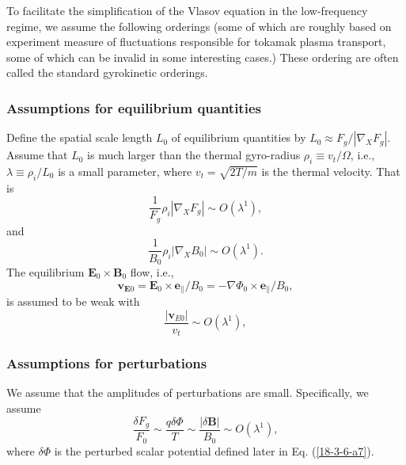 \documentclass{llncs}
\begin{document}
To facilitate the simplification of the Vlasov equation in the low-frequency
regime, we assume the following orderings (some of which are roughly based on
experiment measure of fluctuations responsible for tokamak plasma transport,
some of which can be invalid in some interesting cases.) These ordering are
often called the standard gyrokinetic orderings.

\subsubsection{Assumptions for equilibrium quantities}

Define the spatial scale length $L_0$ of equilibrium quantities by $L_0
\approx F_g / | \nabla_X F_g |$. Assume that $L_0$ is much larger than the
thermal gyro-radius $\rho_i \equiv v_t / \Omega$, i.e., $\lambda \equiv \rho_i
/ L_0$ is a small parameter, where $v_t = \sqrt{2 T / m}$ is the thermal
velocity. That is
\begin{equation}
  \label{17-5-15-1} \frac{1}{F_g} \rho_i | \nabla_X F_g | \sim O (\lambda^1),
\end{equation}
and
\begin{equation}
  \frac{1}{B_0} \rho_i | \nabla_X B_0 | \sim O (\lambda^1) .
\end{equation}
The equilibrium $\mathbf{E}_0 \times \mathbf{B}_0$ flow, i.e.,
\begin{equation}
  \mathbf{v}_{\mathbf{E}0} =\mathbf{E}_0 \times \mathbf{e}_{\parallel} / B_0 =
  - \nabla \Phi_0 \times \mathbf{e}_{\parallel} / B_0,
\end{equation}
is assumed to be weak with
\begin{equation}
  \frac{| \mathbf{v}_{E 0} |}{v_t} \sim O (\lambda^1),
\end{equation}

\subsubsection{Assumptions for perturbations}

We assume that the amplitudes of perturbations are small. Specifically, we
assume
\begin{equation}
  \frac{\delta F_g}{F_0} \sim \frac{q \delta \Phi}{T} \sim \frac{| \delta
  \mathbf{B} |}{B_0} \sim O (\lambda^1),
\end{equation}
where $\delta \Phi$ is the perturbed scalar potential defined later in Eq.
(\ref{18-3-6-a7}).
\end{document}
